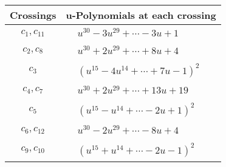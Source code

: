 \documentclass[1p]{elsarticle_modified}
\theoremstyle{definition}
\begin{document}
\begin{tabular}{m{50pt}|m{274pt}}
Crossings & \hspace{64pt}u-Polynomials at each crossing \\
\hline $$\begin{aligned}c_{1},c_{11}\end{aligned}$$&$\begin{aligned}
&u^{30}-3 u^{29}+\cdots-3 u+1
\end{aligned}$\\
\hline $$\begin{aligned}c_{2},c_{8}\end{aligned}$$&$\begin{aligned}
&u^{30}+2 u^{29}+\cdots+8 u+4
\end{aligned}$\\
\hline $$\begin{aligned}c_{3}\end{aligned}$$&$\begin{aligned}
&(u^{15}-4 u^{14}+\cdots+7 u-1)^{2}
\end{aligned}$\\
\hline $$\begin{aligned}c_{4},c_{7}\end{aligned}$$&$\begin{aligned}
&u^{30}+2 u^{29}+\cdots+13 u+19
\end{aligned}$\\
\hline $$\begin{aligned}c_{5}\end{aligned}$$&$\begin{aligned}
&(u^{15}- u^{14}+\cdots-2 u+1)^{2}
\end{aligned}$\\
\hline $$\begin{aligned}c_{6},c_{12}\end{aligned}$$&$\begin{aligned}
&u^{30}-2 u^{29}+\cdots-8 u+4
\end{aligned}$\\
\hline $$\begin{aligned}c_{9},c_{10}\end{aligned}$$&$\begin{aligned}
&(u^{15}+u^{14}+\cdots-2 u-1)^{2}
\end{aligned}$\\
\hline
\end{tabular}\\~\\
\newpage\renewcommand{\arraystretch}{1}
\end{document}
